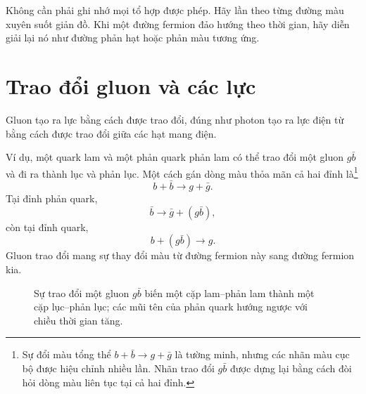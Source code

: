 Không cần phải ghi nhớ mọi tổ hợp được phép. Hãy lần theo từng đường màu xuyên suốt giản đồ. Khi một đường fermion đảo hướng theo thời gian, hãy diễn giải lại nó như đường phản hạt hoặc phản màu tương ứng.

\section{Trao đổi gluon và các lực}

Gluon tạo ra lực bằng cách được trao đổi, đúng như photon tạo ra lực điện từ bằng cách được trao đổi giữa các hạt mang điện.

Ví dụ, một quark lam và một phản quark phản lam có thể trao đổi một gluon \(g\bar b\) và đi ra thành lục và phản lục. Một cách gán dòng màu thỏa mãn cả hai đỉnh là\footnote{Sự đổi màu tổng thể \(b+\bar b\longrightarrow g+\bar g\) là tường minh, nhưng các nhãn màu cục bộ được hiệu chỉnh nhiều lần. Nhãn trao đổi \(g\bar b\) được dựng lại bằng cách đòi hỏi dòng màu liên tục tại cả hai đỉnh.}
\begin{equation}
b+\bar b
\longrightarrow
g+\bar g.
\end{equation}
Tại đỉnh phản quark,
\begin{equation}
\bar b\longrightarrow\bar g+(g\bar b),
\end{equation}
còn tại đỉnh quark,
\begin{equation}
b+(g\bar b)\longrightarrow g.
\end{equation}
Gluon trao đổi mang sự thay đổi màu từ đường fermion này sang đường fermion kia.

\begin{figure}[h]
\centering
{}
\caption{Sự trao đổi một gluon \(g\bar b\) biến một cặp lam--phản lam thành một cặp lục--phản lục; các mũi tên của phản quark hướng ngược với chiều thời gian tăng.}
\end{figure}

